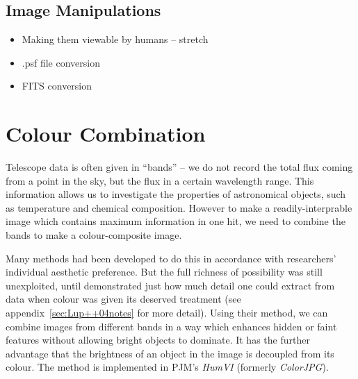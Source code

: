 \documentclass[letterpaper, 11pt]{article}
\begin{document}
\subsection{Image Manipulations}

\begin{itemize}
	\item Making them viewable by humans -- stretch
	\item .psf file conversion
	\item FITS conversion
\end{itemize}




\section{Colour Combination}

Telescope data is often given in ``bands'' -- we do not record the total flux coming from a point in the sky, but the flux in a certain wavelength range. This information allows us to investigate the properties of astronomical objects, such as temperature and chemical composition. However to make a readily-interprable image which contains maximum information in one hit, we need to combine the bands to make a colour-composite image.

Many methods had been developed to do this in accordance with researchers' individual aesthetic preference. But the full richness of possibility was still unexploited, until \citet{Lup++04} demonstrated just how much detail one could extract from data when colour was given its deserved treatment (see appendix~\ref{sec:Lup++04notes} for more detail). Using their method, we can combine images from different bands in a way which enhances hidden or faint features without allowing bright objects to dominate. It has the further advantage that the brightness of an object in the image is decoupled from its colour. The method is implemented in PJM's \emph{HumVI} (formerly \emph{ColorJPG}).
\end{document}
